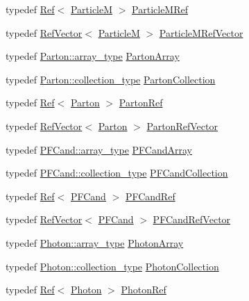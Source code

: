 \begin{DoxyCompactItemize}
\item 
typedef \hyperlink{classpanda_1_1Ref}{Ref}$<$ \hyperlink{classpanda_1_1ParticleM}{ParticleM} $>$ \hyperlink{namespacepanda_a9ab300b299e3fdfb685cb0aae4925e99}{ParticleMRef}
\item 
typedef \hyperlink{classpanda_1_1RefVector}{RefVector}$<$ \hyperlink{classpanda_1_1ParticleM}{ParticleM} $>$ \hyperlink{namespacepanda_ab752f2f6e8cc21c37d67ed552500b70a}{ParticleMRefVector}
\item 
typedef \hyperlink{classpanda_1_1Array}{Parton::array\_\-type} \hyperlink{namespacepanda_a4b45a509f15ea6c03f31cfe3b60c649c}{PartonArray}
\item 
typedef \hyperlink{classpanda_1_1Collection}{Parton::collection\_\-type} \hyperlink{namespacepanda_a74b06d43d55cb73964b16fdba8c41dfa}{PartonCollection}
\item 
typedef \hyperlink{classpanda_1_1Ref}{Ref}$<$ \hyperlink{classpanda_1_1Parton}{Parton} $>$ \hyperlink{namespacepanda_a7cb499321c395ab6cd0b8b8354cf6c9b}{PartonRef}
\item 
typedef \hyperlink{classpanda_1_1RefVector}{RefVector}$<$ \hyperlink{classpanda_1_1Parton}{Parton} $>$ \hyperlink{namespacepanda_ae5c73375c0b1ea59cda1767e3ee94446}{PartonRefVector}
\item 
typedef \hyperlink{classpanda_1_1Array}{PFCand::array\_\-type} \hyperlink{namespacepanda_aed16d5b918c5d47b599d6d879da8b5aa}{PFCandArray}
\item 
typedef \hyperlink{classpanda_1_1Collection}{PFCand::collection\_\-type} \hyperlink{namespacepanda_a0ca34b0773035be0526701d0b93426e2}{PFCandCollection}
\item 
typedef \hyperlink{classpanda_1_1Ref}{Ref}$<$ \hyperlink{classpanda_1_1PFCand}{PFCand} $>$ \hyperlink{namespacepanda_a0427290b9b2d3622f3a6ee8829a878ea}{PFCandRef}
\item 
typedef \hyperlink{classpanda_1_1RefVector}{RefVector}$<$ \hyperlink{classpanda_1_1PFCand}{PFCand} $>$ \hyperlink{namespacepanda_a0b660af02255ee546b472b239c5ddbc1}{PFCandRefVector}
\item 
typedef \hyperlink{classpanda_1_1Array}{Photon::array\_\-type} \hyperlink{namespacepanda_ad0a6600ca9dca4eeb7e932c99890e060}{PhotonArray}
\item 
typedef \hyperlink{classpanda_1_1Collection}{Photon::collection\_\-type} \hyperlink{namespacepanda_a4acbed6412a6a61d07b0960736e25015}{PhotonCollection}
\item 
typedef \hyperlink{classpanda_1_1Ref}{Ref}$<$ \hyperlink{classpanda_1_1Photon}{Photon} $>$ \hyperlink{namespacepanda_ad94d8e9e3f18c0a85465d5d8ba8b1d75}{PhotonRef}

\end{DoxyCompactItemize}
